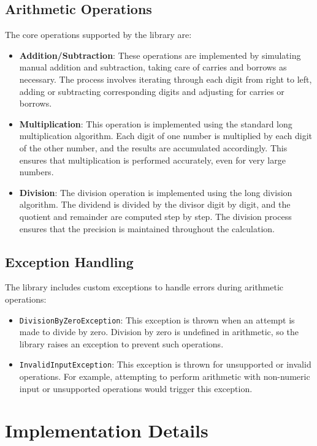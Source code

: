 \documentclass[12pt]{article}
\begin{document}
\subsection{Arithmetic Operations}
The core operations supported by the library are:
\begin{itemize}
    \item \textbf{Addition/Subtraction}: These operations are implemented by simulating manual addition and subtraction, taking care of carries and borrows as necessary. The process involves iterating through each digit from right to left, adding or subtracting corresponding digits and adjusting for carries or borrows.
    \item \textbf{Multiplication}: This operation is implemented using the standard long multiplication algorithm. Each digit of one number is multiplied by each digit of the other number, and the results are accumulated accordingly. This ensures that multiplication is performed accurately, even for very large numbers.
    \item \textbf{Division}: The division operation is implemented using the long division algorithm. The dividend is divided by the divisor digit by digit, and the quotient and remainder are computed step by step. The division process ensures that the precision is maintained throughout the calculation.
\end{itemize}

\subsection{Exception Handling}
The library includes custom exceptions to handle errors during arithmetic operations:
\begin{itemize}
    \item \texttt{DivisionByZeroException}: This exception is thrown when an attempt is made to divide by zero. Division by zero is undefined in arithmetic, so the library raises an exception to prevent such operations.
    \item \texttt{InvalidInputException}: This exception is thrown for unsupported or invalid operations. For example, attempting to perform arithmetic with non-numeric input or unsupported operations would trigger this exception.
\end{itemize}

\section{Implementation Details}
\end{document}
